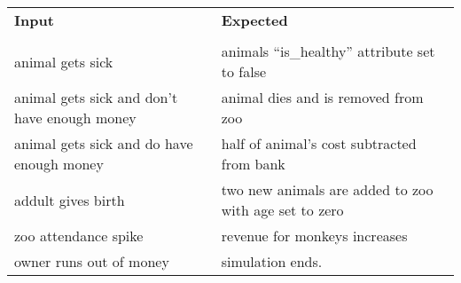 \documentclass[a4paper, 11pt]{article}
\begin{document}
\begin{center}
 \begin{tabular}{l|l} %
   \textbf{Input} & \textbf{Expected} \\
    &    \\
   \hline
   animal gets sick & animals ``is\_healthy'' attribute set to false \\
   animal gets sick and don't have enough money & animal dies and is removed from  zoo\\
   animal gets sick and do have enough money & half of animal's cost subtracted from bank\\
   addult gives birth & two new animals are added to zoo with age set to zero \\
   zoo attendance spike & revenue for monkeys increases \\
   owner runs out of money & simulation ends.
 \end{tabular}
\end{center} 
\end{document}
